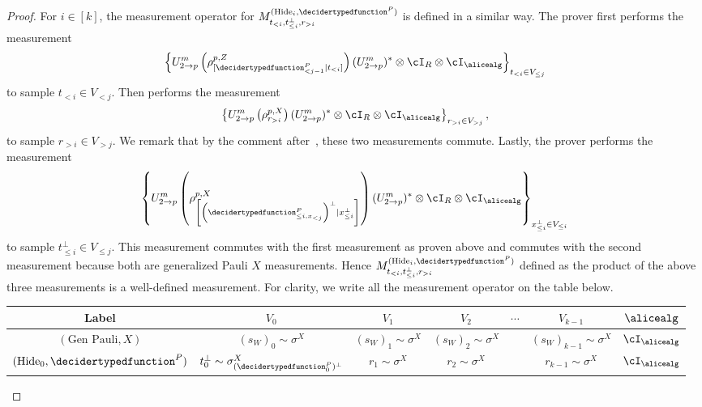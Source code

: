 \begin{proof}
	For $i \in [k]$, the measurement operator for $M^{(\text{Hide}_{i}, \decidertypedfunction^{P})}_{t_{< i}, t^{\bot}_{\leq i},r_{> i}}$ is defined in a similar way. The prover first performs the measurement 
	\begin{equation*} 
		\left\{ U_{2 \rightarrow p}^m  \left(\rho^{p, Z}_{[\decidertypedfunction^{P}_{< j-1}|t_{< i}]} \right) (U_{2 \rightarrow p}^m)^* \otimes\cI_{R} \otimes \cI_{\alicealg} \right\}_{t_{< i} \in V_{\leq j}}
	\end{equation*}
	to sample $t_{< i} \in V_{< j}$. Then performs the measurement 
	\begin{equation*} 
		\left\{U_{2 \rightarrow p}^m  \left(\rho^{p, X}_{r_{> i}} \right) (U_{2 \rightarrow p}^m)^* \otimes\cI_{R} \otimes \cI_{\alicealg} \right\}_{r_{> i} \in V_{> j}},
	\end{equation*}
 	 to sample $r_{> i} \in V_{> j}$. We remark that by the comment after~, these two measurements commute. Lastly, the prover performs the measurement
 	 \begin{equation} 
 	 	\left\{  U_{2 \rightarrow p}^m \left(\rho^{p, X}_{\left[ \left(\decidertypedfunction^{P}_{\leq i, x_{< j}}\right)^{\bot}|x_{\leq i}^{\bot}\right]} \right)(U_{2 \rightarrow p}^m)^* \otimes\cI_{R} \otimes \cI_{\alicealg}   \right\}_{x_{\leq i}^{\bot} \in V_{\leq i}}
 	 \end{equation}
   	to sample $t^{\bot}_{\leq i} \in V_{\leq j}$. This measurement commutes with the first measurement as proven above and commutes with the second measurement because both are generalized Pauli $X$ measurements. Hence $M^{(\text{Hide}_{i}, \decidertypedfunction^{P})}_{t_{< i}, t^{\bot}_{\leq i},r_{> i}}$ defined as the product of the above three measurements is a well-defined measurement. For clarity, we write all the measurement operator on the table below. 
	\begin{table}[!htb]
		\centering
		\footnotesize
      \renewcommand{\arraystretch}{1.8}
	\begin{tabularx}{\textwidth}{c c c c c c c}
			\hline
		Label	& $V_0$ &  $V_1$ &$V_2$ & $\cdots$ &  $V_{k-1}$ & $\alicealg$   \\
			\hline
		$(\text{Gen Pauli}, X)$ & $(s_{W})_0 \sim \sigma^{X}$ & $(s_{W})_1 \sim\sigma^{X}$ & $(s_{W})_2 \sim\sigma^{X}$ &  &$(s_{W})_{k-1} \sim\sigma^{X}$ & $\cI_{\alicealg}$ \\
		\hline
		$(\text{Hide}_{0}, \decidertypedfunction^{P})$ & $t_0^{\bot} \sim \sigma^{X}_{(\decidertypedfunction^P_{0})^{\bot}}$ & $r_1 \sim\sigma^{X}$ & $r_2 \sim\sigma^{X}$ &  &$r_{k-1} \sim\sigma^{X}$ & $\cI_{\alicealg}$ \\

\end{tabularx}
\end{table}
\end{proof}
